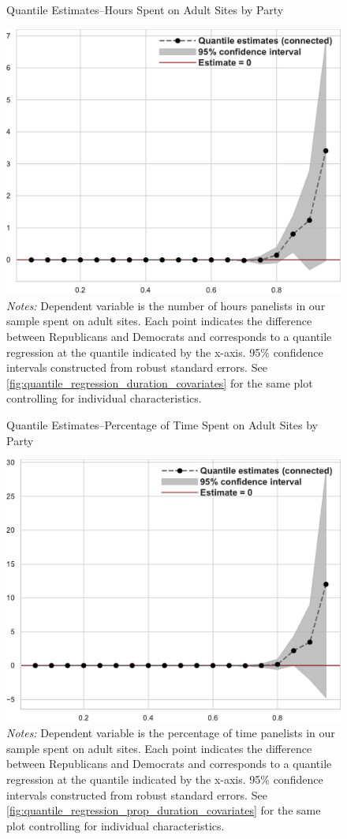 \documentclass[12pt, letterpaper]{article}
\begin{document}
\begin{figure}[ht]
\centering
\caption{Quantile Estimates--Hours Spent on Adult Sites by Party}
\includegraphics[width=.6\linewidth]{../figs/quantile_reg_duration_adult.pdf}
	\caption*{\footnotesize \emph{Notes:} 
		Dependent variable is the number of hours panelists in our sample spent on adult sites.
		Each point indicates the difference between Republicans and Democrats and corresponds to a quantile regression at the quantile indicated by the x-axis.
		95\% confidence intervals constructed from robust standard errors.
		See \cref{fig:quantile_regression_duration_covariates} for the same plot controlling for individual characteristics.
}
\label{fig:quantile_regression_duration}
\end{figure}

\begin{figure}[ht]
	\centering
	\caption{Quantile Estimates--Percentage of Time Spent on Adult Sites by Party}
	\includegraphics[width=.6\linewidth]{../figs/quantile_reg_proportion_duration_adult.pdf}
	\caption*{\footnotesize \emph{Notes:} 
		Dependent variable is the percentage of time panelists in our sample spent on adult sites.
		Each point indicates the difference between Republicans and Democrats and corresponds to a quantile regression at the quantile indicated by the x-axis.
		95\% confidence intervals constructed from robust standard errors.
		See \cref{fig:quantile_regression_prop_duration_covariates} for the same plot controlling for individual characteristics.
	}
	\label{fig:quantile_regression_prop_duration}
\end{figure}
\end{document}
